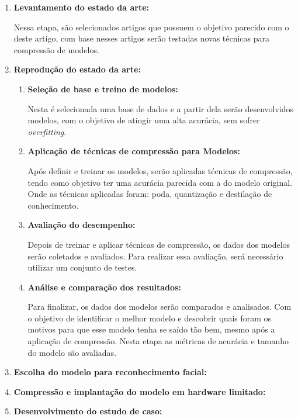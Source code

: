 \begin{enumerate}
	\item \textbf{Levantamento do estado da arte:}

		Nessa etapa, são selecionados artigos que possuem o objetivo parecido com o deste artigo,
		com base nesses artigos serão testadas novas técnicas para compressão de modelos.

	\item \textbf{Reprodução do estado da arte:}

	\begin{enumerate}
		\item \textbf{Seleção de base e treino de modelos:}

			Nesta é selecionada uma base de dados e a partir dela serão desenvolvidos modelos,
			com o objetivo de atingir uma alta acurácia, sem sofrer \textit{overfitting}.

		\item \textbf{Aplicação de técnicas de compressão para Modelos:}

			Após definir e treinar os modelos, serão aplicadas técnicas de compressão, tendo como
			objetivo ter uma acurácia parecida com a do modelo original. Onde as técnicas aplicadas
			foram: poda, quantização e destilação de conhecimento.

		\item \textbf{Avaliação do desempenho:}

			Depois de treinar e aplicar técnicas de compressão, os dados dos modelos serão coletados e
			avaliados. Para realizar essa avaliação, será necessário utilizar um conjunto de testes.

		\item \textbf{Análise e comparação dos resultados:}

			Para finalizar, os dados dos modelos serão comparados e analisados. Com o objetivo de
			identificar o melhor modelo e descobrir quais foram os motivos para que esse modelo tenha se
			saído tão bem, mesmo após a aplicação de compressão. Nesta etapa as métricas de acurácia e
			tamanho do modelo são avaliadas.
	\end{enumerate}

	\item \textbf{Escolha do modelo para reconhecimento facial:}

	\item \textbf{Compressão e implantação do modelo em hardware limitado:}

	\item \textbf{Desenvolvimento do estudo de caso:}
\end{enumerate}

